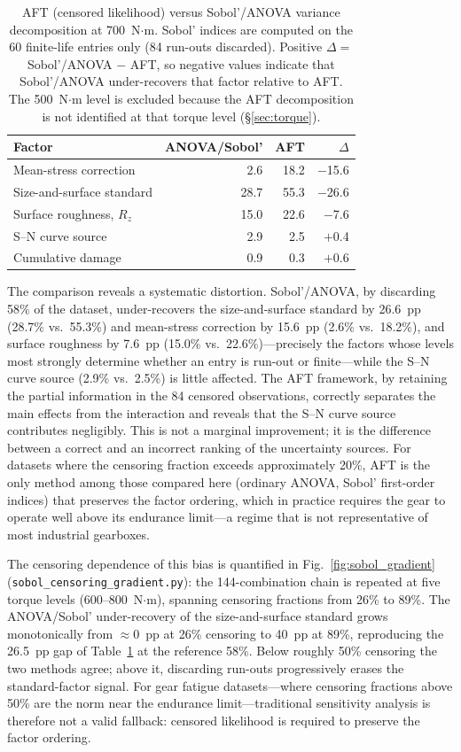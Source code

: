 \documentclass[twocolumn,12pt,a4paper]{article}
\begin{document}
\begin{table}[ht]
\centering
\caption{AFT (censored likelihood) versus Sobol'/ANOVA variance
decomposition at 700~N$\cdot$m. Sobol' indices are computed on the
60 finite-life entries only (84 run-outs discarded). Positive
$\Delta = $ Sobol'/ANOVA $-$ AFT, so negative values indicate that
Sobol'/ANOVA under-recovers that factor relative to AFT. The
500~N$\cdot$m level is excluded because the AFT decomposition is not
identified at that torque level (\S\ref{sec:torque}).\label{tab:aft_vs_anova}}
\footnotesize
\begin{tabular}{lrrr}
\toprule
Factor & ANOVA/Sobol' & AFT & $\Delta$ \\
\midrule
Mean-stress correction & 2.6 & 18.2 & $-$15.6 \\
Size-and-surface standard & 28.7 & 55.3 & $-$26.6 \\
Surface roughness, $R_z$ & 15.0 & 22.6 & $-$7.6 \\
S--N curve source & 2.9 & 2.5 & $+$0.4 \\
Cumulative damage & 0.9 & 0.3 & $+$0.6 \\
\bottomrule
\end{tabular}
\end{table}

The comparison reveals a systematic distortion. Sobol'/ANOVA, by
discarding 58\% of the dataset, under-recovers the size-and-surface
standard by 26.6~pp (28.7\% vs.\ 55.3\%) and mean-stress correction by
15.6~pp (2.6\% vs.\ 18.2\%), and surface roughness by 7.6~pp (15.0\%
vs.\ 22.6\%)---precisely the factors whose levels most
strongly determine whether an entry is run-out or finite---while the
S--N curve source (2.9\% vs.\ 2.5\%) is little affected. The AFT
framework, by retaining the partial
information in the 84 censored observations, correctly separates the
main effects from the interaction and reveals that the S--N curve
source contributes negligibly. This is not a marginal improvement;
it is the difference between a correct and an incorrect ranking of the
uncertainty sources. For datasets where the censoring fraction exceeds
approximately 20\%, AFT is the only method among those compared here (ordinary
ANOVA, Sobol' first-order indices) that preserves the factor ordering, which in practice
requires the gear to operate well above its endurance limit---a regime
that is not representative of most industrial gearboxes.

The censoring dependence of this bias is quantified in
Fig.~\ref{fig:sobol_gradient} (\texttt{sobol\_censoring\_gradient.py}):
the 144-combination chain is repeated at five torque levels
(600--800~N$\cdot$m), spanning censoring fractions from 26\% to 89\%.
The ANOVA/Sobol' under-recovery of the size-and-surface standard grows
monotonically from $\approx$0~pp at 26\% censoring to 40~pp at 89\%,
reproducing the 26.5~pp gap of Table~\ref{tab:aft_vs_anova} at the
reference 58\%. Below roughly 50\% censoring the two methods agree;
above it, discarding run-outs progressively erases the standard-factor
signal. For gear fatigue datasets---where censoring fractions above
50\% are the norm near the endurance limit---traditional sensitivity
analysis is therefore not a valid fallback: censored likelihood is
required to preserve the factor ordering.
\end{document}
